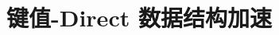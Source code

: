 \chapter{键值-Direct 数据结构加速}
\label{chapter:kvdirect}

\renewcommand{\thefootnote}{\fnsymbol{footnote}}
\def\name{键值-Direct}
\def\fullname{Remote Direct Key-Value Access}
\def\sysname{}

\newcommand{\specialcell}[2][c]{%
  \begin{tabular}[#1]{@{}c@{}}#2\end{tabular}}









